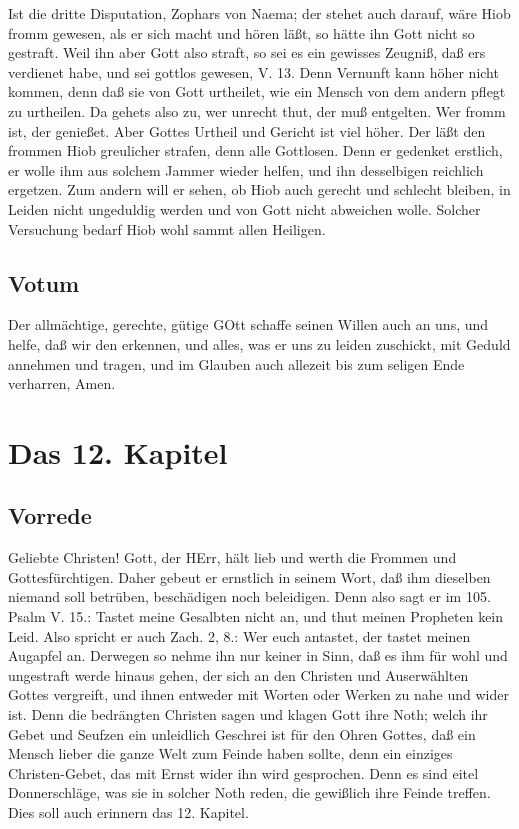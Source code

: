 Ist die dritte Disputation, Zophars von Naema; der stehet auch darauf, wäre Hiob fromm gewesen, als er sich macht und hören läßt, so hätte ihn Gott nicht so gestraft. Weil ihn aber Gott also straft, so sei es ein gewisses Zeugniß, daß ers verdienet habe, und sei gottlos gewesen, V. 13. Denn Vernunft kann höher nicht kommen, denn daß sie von Gott urtheilet, wie ein Mensch von dem andern pflegt zu urtheilen. Da gehets also zu, wer unrecht thut, der muß entgelten. Wer fromm ist, der genießet. Aber Gottes Urtheil und Gericht ist viel höher. Der läßt den frommen Hiob greulicher strafen, denn alle Gottlosen. Denn er gedenket erstlich, er wolle ihm aus solchem Jammer wieder helfen, und ihn desselbigen reichlich ergetzen. Zum andern will er sehen, ob Hiob auch gerecht und schlecht bleiben, in Leiden nicht ungeduldig werden und von Gott nicht abweichen wolle. Solcher Versuchung bedarf Hiob wohl sammt allen Heiligen.

\section{Votum}

Der allmächtige, gerechte, gütige GOtt schaffe seinen Willen auch an uns, und helfe, daß wir den erkennen, und alles, was er uns zu leiden zuschickt, mit Geduld annehmen und tragen, und im Glauben auch allezeit bis zum seligen Ende verharren, Amen.

\chapter{Das 12. Kapitel}

\section{Vorrede}

Geliebte Christen! Gott, der HErr, hält lieb und werth die Frommen und Gottesfürchtigen. Daher gebeut er ernstlich in seinem Wort, daß ihm dieselben niemand soll betrüben, beschädigen noch beleidigen. Denn also sagt er im 105. Psalm V. 15.: Tastet meine Gesalbten nicht an, und thut meinen Propheten kein Leid. Also spricht er auch Zach. 2, 8.: Wer euch antastet, der tastet meinen Augapfel an. Derwegen so nehme ihn nur keiner in Sinn, daß es ihm für wohl und ungestraft werde hinaus gehen, der sich an den Christen und Auserwählten Gottes vergreift, und ihnen entweder mit Worten oder Werken zu nahe und wider ist. Denn die bedrängten Christen sagen und klagen Gott ihre Noth; welch ihr Gebet und Seufzen ein unleidlich
 Geschrei ist für den Ohren Gottes, daß ein Mensch lieber die ganze Welt zum Feinde haben sollte, denn ein einziges Christen-Gebet, das mit Ernst wider ihn wird gesprochen. Denn es sind eitel Donnerschläge, was sie in solcher Noth reden, die gewißlich ihre Feinde treffen. Dies soll auch erinnern das 12. Kapitel.

